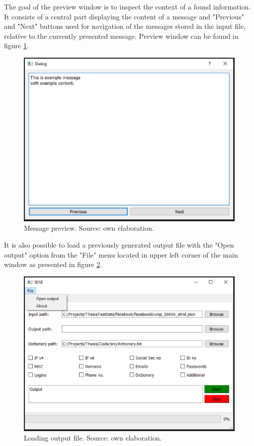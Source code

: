 \documentclass[a4paper,twoside,12pt]{book}
\begin{document}
The goal of the preview window is to inspect the context of a found information. It consists of a central part 
displaying the content of a message and "Previous" and "Next" buttons used for navigation of the messages stored
in the input file, relative to the currently presented message. Preview window can be found in figure \ref{fig:MessagePrev}.

\begin{figure}
\centering
\includegraphics{Images/MessagePrev}
\caption{Message preview. Source: own elaboration.}
\label{fig:MessagePrev}
\end{figure}

It is also possible to load a previously generated output file with the "Open output" option from the
"File" menu located in upper left corner of the main window as presented in figure \ref{fig:OpeningOutput}.

\begin{figure}
\centering
\includegraphics{Images/OpeningOutput}
\caption{Loading output file. Source: own elaboration.}
\label{fig:OpeningOutput}
\end{figure}
\end{document}
